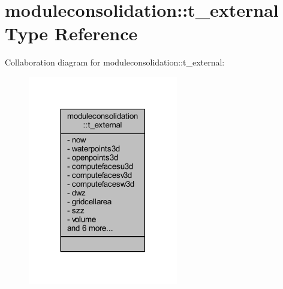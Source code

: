 \hypertarget{structmoduleconsolidation_1_1t__external}{}\section{moduleconsolidation\+:\+:t\+\_\+external Type Reference}
\label{structmoduleconsolidation_1_1t__external}


Collaboration diagram for moduleconsolidation\+:\+:t\+\_\+external\+:\nopagebreak
\begin{figure}[H]
\begin{center}
\leavevmode
\includegraphics[width=185pt]{structmoduleconsolidation_1_1t__external__coll__graph}
\end{center}
\end{figure}
